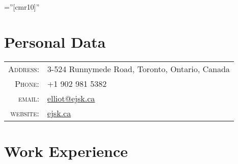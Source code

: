 \documentclass[a4paper,11pt]{article} %
\begin{document}
\pagestyle{empty} %

\font\fb=''[cmr10]'' %


\par{\bigskip\par} %

\section{Personal Data}

\begin{tabular}{rl}
\textsc{Address:} & 3-524 Runnymede Road, Toronto, Ontario, Canada \\
\textsc{Phone:} & +1 902 981 5382\\
\textsc{email:} & \href{mailto:elliot@ejsk.ca}{elliot@ejsk.ca}\\
\textsc{website:} & \href{http://www.ejsk.ca}{ejsk.ca}\\
\end{tabular}


\section{Work Experience}
\end{document}
